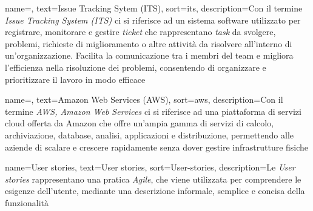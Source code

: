 








 {
    name=,
    text=Issue Tracking Sytem (ITS),
    sort=its,
    description={Con il termine \emph{Issue Tracking System (ITS) } ci si riferisce ad un sistema software utilizzato per registrare, monitorare e gestire \textit{ticket} che rappresentano \textit{task} da svolgere, problemi, richieste di miglioramento o altre attività da risolvere all’interno di un’organizzazione. Facilita la comunicazione tra i membri del team e migliora l’efficienza nella risoluzione dei problemi, consentendo di organizzare e prioritizzare il lavoro in modo efficace}
}

 {
    name=,
    text=Amazon Web Services (AWS),
    sort=aws,
    description={Con il termine \emph{AWS, Amazon Web Services} ci si riferisce ad una piattaforma di servizi cloud offerta da Amazon che offre un’ampia gamma di servizi di calcolo, archiviazione, database, analisi, applicazioni e distribuzione, permettendo alle aziende di scalare e crescere rapidamente senza dover gestire infrastrutture fisiche}
}

 {
    name=User stories,
    text=User stories,
    sort=User-stories,
    description={Le \emph{User stories} rappresentano una pratica \textit{Agile}, che viene utilizzata per comprendere le esigenze dell'utente, mediante una descrizione informale, semplice e concisa della funzionalità}
}

